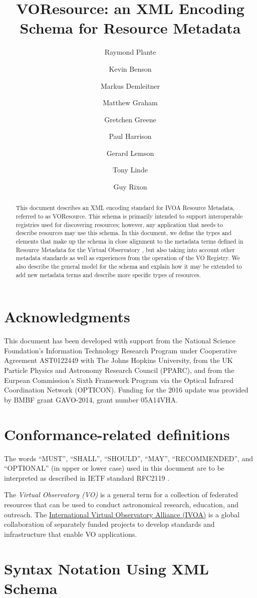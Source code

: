 \documentclass[11pt,a4paper]{ivoa}
\title{VOResource: an XML Encoding Schema for Resource Metadata}
\author[http://www.ivoa.net/twiki/bin/view/IVOA/RayPlante]{Raymond Plante}
\author[http://www.ivoa.net/twiki/bin/view/IVOA/KevinBenson]{Kevin Benson}
\author[http://www.ivoa.net/twiki/bin/view/IVOA/MarkusDemleitner]{Markus Demleitner}
\author[http://www.ivoa.net/twiki/bin/view/IVOA/MatthewGraham]{Matthew Graham}
\author[http://www.ivoa.net/twiki/bin/view/IVOA/GretchenGreene]{Gretchen Greene}
\author[http://www.ivoa.net/twiki/bin/view/IVOA/PaulHarrison]{Paul Harrison}
\author[http://www.ivoa.net/twiki/bin/view/IVOA/GerardLemson]{Gerard Lemson}
\author[http://www.ivoa.net/twiki/bin/view/IVOA/TonyLinde]{Tony Linde}
\author[http://www.ivoa.net/twiki/bin/view/IVOA/GuyRixon]{Guy Rixon}
\begin{document}
\begin{abstract}
This document describes an XML encoding standard for IVOA Resource
Metadata, referred to as VOResource.  This schema is primarily
intended to support interoperable registries used for discovering
resources; however, any application that needs to describe resources
may use this schema.  In this document, we define the types and
elements that make up the schema in close alignment to the metadata terms
defined in Resource Metadata for the Virtual Observatory
\citep{2007ivoa.spec.0302H}, but also taking into account other metadata
standards as well as experiences from the operation of the VO Registry.
We also describe the general model for the
schema and explain how it may be extended to add new metadata terms and
describe more specific types of resources.  
\end{abstract}


\section*{Acknowledgments}

This document has been developed with support from the
National Science Foundation's
Information Technology Research Program under Cooperative Agreement
AST0122449 with The Johns Hopkins University, from the
UK Particle Physics and Astronomy
Research Council (PPARC), and from the
Eurpean Commission's Sixth
Framework Program via the 
Optical Infrared Coordination Network (OPTICON).  Funding for the 2016
update was provided by BMBF grant GAVO-2014, grant number 05A14VHA.

\section*{Conformance-related definitions}

The words ``MUST'', ``SHALL'', ``SHOULD'', ``MAY'', ``RECOMMENDED'', and
``OPTIONAL'' (in upper or lower case) used in this document are to be
interpreted as described in IETF standard RFC2119 \citep{std:RFC2119}.

The \emph{Virtual Observatory (VO)} is a
general term for a collection of federated resources that can be used
to conduct astronomical research, education, and outreach.
The \href{http://www.ivoa.net}{International
Virtual Observatory Alliance (IVOA)} is a global
collaboration of separately funded projects to develop standards and
infrastructure that enable VO applications.

\section*{Syntax Notation Using XML Schema}
\end{document}

